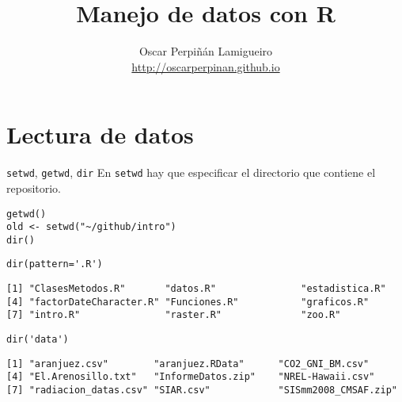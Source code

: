 \documentclass[xcolor={usenames,svgnames,dvipsnames}]{beamer}
\author{Oscar Perpiñán Lamigueiro \\ \url{http://oscarperpinan.github.io}}
\date{}
\title{Manejo de datos con R}
\begin{document}
\maketitle

\section{Lectura de datos}
\label{sec:org5cf3549}
\begin{frame}[label={sec:org1f8d746},fragile]{\texttt{setwd}, \texttt{getwd}, \texttt{dir}}
 En \texttt{setwd} hay que especificar el directorio que contiene el repositorio.
\lstset{language=r,label= ,caption= ,captionpos=b,numbers=none}
\begin{lstlisting}
getwd()
old <- setwd("~/github/intro")
dir()
\end{lstlisting}

\lstset{language=r,label= ,caption= ,captionpos=b,numbers=none}
\begin{lstlisting}
dir(pattern='.R')
\end{lstlisting}

\begin{verbatim}
[1] "ClasesMetodos.R"       "datos.R"               "estadistica.R"        
[4] "factorDateCharacter.R" "Funciones.R"           "graficos.R"           
[7] "intro.R"               "raster.R"              "zoo.R"
\end{verbatim}


\lstset{language=r,label= ,caption= ,captionpos=b,numbers=none}
\begin{lstlisting}
dir('data')
\end{lstlisting}

\begin{verbatim}
[1] "aranjuez.csv"        "aranjuez.RData"      "CO2_GNI_BM.csv"     
[4] "El.Arenosillo.txt"   "InformeDatos.zip"    "NREL-Hawaii.csv"    
[7] "radiacion_datas.csv" "SIAR.csv"            "SISmm2008_CMSAF.zip"
\end{verbatim}
\end{frame}
\end{document}

